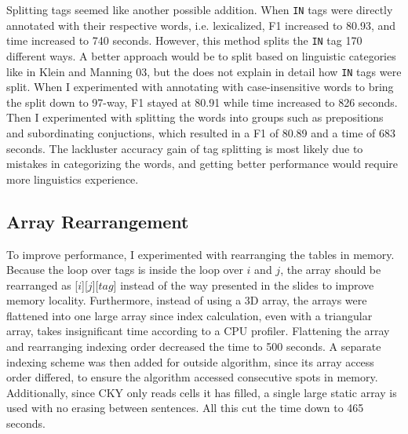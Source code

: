 \documentclass[11pt]{article}
\begin{document}
Splitting tags seemed like another possible addition. When \texttt{IN} tags were directly
annotated with their respective words, i.e. lexicalized, F1 increased to 80.93, and time increased to
740 seconds. However, this method splits the \texttt{IN} tag 170 different ways. A better approach
would be to split based on linguistic categories like in Klein and Manning 03,
but the does not explain in detail how \texttt{IN} tags were split. When I experimented with
annotating with case-insensitive words to bring the split down to 97-way, F1 stayed at 80.91
while time increased to 826 seconds. Then I experimented with splitting the words into groups
such as prepositions and subordinating conjuctions, which resulted in a F1 of 80.89 and a time of
683 seconds. The lackluster accuracy gain of tag splitting is most likely due to mistakes in
categorizing the words, and getting better performance would require more linguistics experience.

\subsection{Array Rearrangement}
To improve performance, I experimented with rearranging the tables in memory. Because the loop over
tags is inside the loop over $i$ and $j$, the array should be rearranged as [$i$][$j$][$tag$] instead
of the way presented in the slides to improve memory locality. Furthermore, instead of using a
3D array, the arrays were flattened into one large array since index calculation,
even with a triangular array, takes insignificant time according to a CPU profiler. Flattening the
array and rearranging indexing order decreased the time to 500 seconds. A separate indexing scheme
was then added for outside algorithm, since its array access order differed, to ensure the algorithm
accessed consecutive spots in memory. Additionally, since CKY only reads cells it has filled,
a single large static array is used with no erasing between sentences. All this cut the time down
to 465 seconds.
\end{document}
